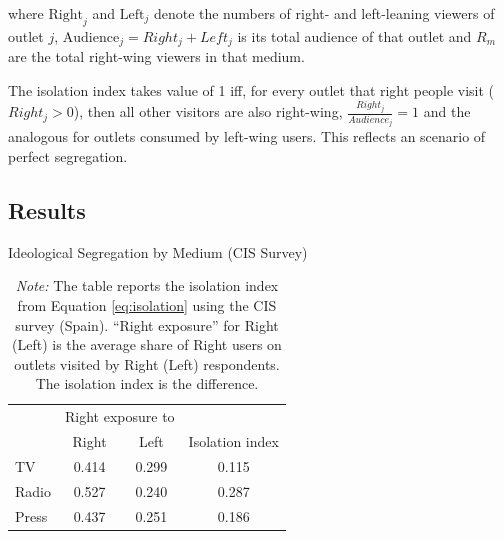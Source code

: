 \documentclass[12pt]{article}
\begin{document}
%
where $\mathrm{Right}_j$ and $\mathrm{Left}_j$ denote the numbers of right- and left-leaning viewers of outlet $j$, $\text{Audience}_j=Right_j + Left_j$ is its total audience of that outlet and $R_m$ are the total right-wing viewers in that medium. 

The isolation index takes value of 1 iff, for every outlet that right people visit ($Right_j>0$), then all other visitors are also right-wing, $\frac{Right_j}{Audience_j}=1$ and the analogous for outlets consumed by left-wing users. This reflects an scenario of perfect segregation. 




	\subsection{Results}
\FloatBarrier	
	
	\begin{table}[H]
		\caption{Ideological Segregation by Medium (CIS Survey)}
		\label{tab:isolation_table}
		
		\centering
		\begin{tabular}{lccc}
			\hline
			& \multicolumn{2}{c}{Right exposure to } & \\
			\cline{2-3}
			& Right & Left & Isolation index \\
			\hline
			TV    & 0.414 & 0.299 & 0.115 \\
			Radio & 0.527 & 0.240 & 0.287 \\
			Press & 0.437 & 0.251 & 0.186 \\
			\hline
		\end{tabular}
		

		
		\caption*{\small  \textit{Note:} The table reports the isolation index from Equation \ref{eq:isolation}  using the CIS survey (Spain). “Right exposure” for Right (Left) is the average share of Right users on outlets visited by Right (Left) respondents. The isolation index is the difference.}
		
	\end{table}
	
	
	
\end{document}
